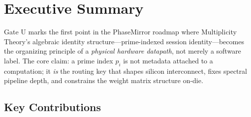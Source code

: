 \documentclass[12pt,letterpaper]{article}
\theoremstyle{plain}
\theoremstyle{definition}
\theoremstyle{remark}
\begin{document}
\section{Executive Summary}

Gate U marks the first point in the PhaseMirror roadmap where Multiplicity
Theory's algebraic identity structure---prime-indexed session identity---becomes
the organizing principle of a \emph{physical hardware datapath}, not merely a
software label. The core claim: a prime index \(p_i\) is not metadata attached
to a computation; it \emph{is} the routing key that shapes silicon interconnect,
fixes spectral pipeline depth, and constrains the weight matrix structure on-die.

\subsection{Key Contributions}
\end{document}
